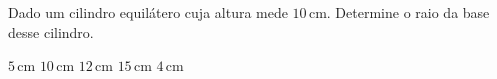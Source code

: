 Dado um cilindro equilátero cuja altura mede $10$\,cm. Determine o raio da base desse cilindro.

$5$\,cm
$10$\,cm
$12$\,cm
$15$\,cm
$4$\,cm



